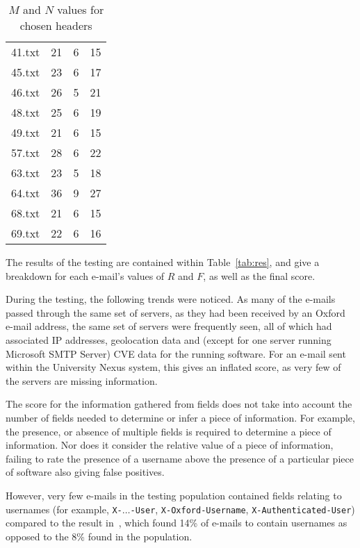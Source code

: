 \begin{table}
\begin{tabular}{@{}cccc@{}}
41.txt & 21           & 6                     & 15                 \\
45.txt & 23           & 6                     & 17                 \\
46.txt & 26           & 5                     & 21                 \\
48.txt & 25           & 6                     & 19                 \\
49.txt & 21           & 6                     & 15                 \\
57.txt & 28           & 6                     & 22                 \\
63.txt & 23           & 5                     & 18                 \\
64.txt & 36           & 9                     & 27                 \\
68.txt & 21           & 6                     & 15                 \\
69.txt & 22           & 6                     & 16                 \\
\bottomrule
\end{tabular}
\caption{$M$ and $N$ values for chosen headers}
\label{tab:sammn}
\end{table}

The results of the testing are contained within Table~\ref{tab:res}, and give a
breakdown for each e-mail's values of $R$ and $F$, as well as the final score.

During the testing, the following trends were noticed.  As many of the e-mails
passed through the same set of servers, as they had been received by an Oxford
e-mail address, the same set of servers were frequently seen, all of which had
associated IP addresses, geolocation data and (except for one server running
Microsoft SMTP Server) CVE data for the running software.  For an e-mail sent
within the University Nexus system, this gives an inflated score, as very few
of the servers are missing information.

The score for the information gathered from fields does not take into account
the number of fields needed to determine or infer a piece of information. For
example, the presence, or absence of multiple fields is required to determine a
piece of information.  Nor does it consider the relative value of a piece of
information, failing to rate the presence of a username above the presence of a
particular piece of software also giving false positives.

However, very few e-mails in the testing population contained fields relating
to usernames (for example, \texttt{X-}$\ldots$\texttt{-User}, \texttt{X-Oxford-Username},
\texttt{X-Authenticated-User}) compared to the result
in~\cite{nurse2015investigating}, which found 14\% of e-mails to contain
usernames as opposed to the 8\% found in the population.

